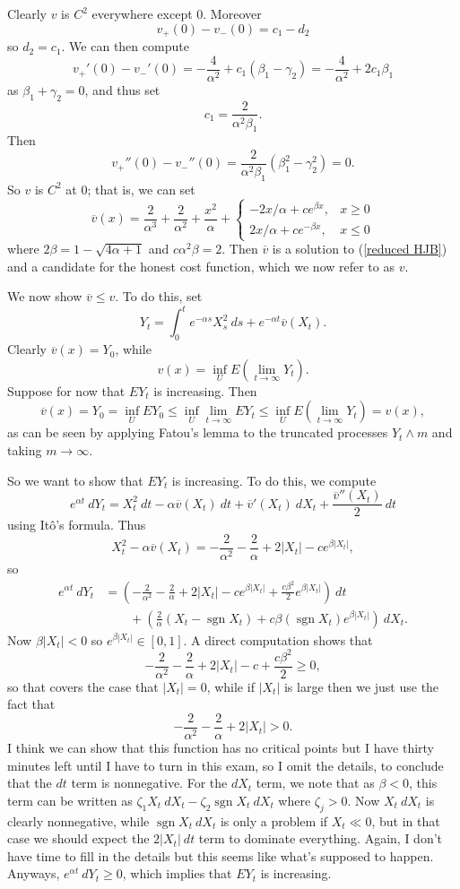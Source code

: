 \documentclass[10pt]{article}
\newcommand{\sgn}{\operatorname{sgn}}
\theoremstyle{definition}
\begin{document}
Clearly $v$ is $C^2$ everywhere except $0$.
Moreover
$$v_+(0) - v_-(0) = c_1 - d_2$$
so $d_2 = c_1$. We can then compute
$$v_+'(0) - v_-'(0) = -\frac{4}{\alpha^2} + c_1(\beta_1 - \gamma_2) = -\frac{4}{\alpha^2} + 2c_1\beta_1$$
as $\beta_1 + \gamma_2 = 0$, and thus set
$$c_1 = \frac{2}{\alpha^2\beta_1}.$$
Then
$$v_+''(0) - v_-''(0) = \frac{2}{\alpha^2\beta_1}(\beta_1^2 - \gamma_2^2) = 0.$$
So $v$ is $C^2$ at $0$; that is, we can set
$$\overline v(x) = \frac{2}{\alpha^3} + \frac{2}{\alpha^2} + \frac{x^2}{\alpha} + \begin{cases}
-2x/\alpha + ce^{\beta x}, &x \geq 0\\
2x/\alpha + ce^{-\beta x}, &x \leq 0
\end{cases}$$
where $2\beta = 1 - \sqrt{4\alpha + 1}$ and $c\alpha^2\beta = 2$.
Then $\overline v$ is a solution to (\ref{reduced HJB}) and a candidate for the honest cost function, which we now refer to as $v$.

We now show $\overline v \leq v$. To do this, set
$$Y_t = \int_0^t e^{-\alpha s} X_s^2 ~ds + e^{-\alpha t} \overline v(X_t).$$
Clearly $\overline v(x) = Y_0$, while
$$v(x) = \inf_U E\left(\lim_{t \to \infty} Y_t\right).$$
Suppose for now that $EY_t$ is increasing. Then
$$\overline v(x) = Y_0 = \inf_U EY_0 \leq \inf_U \lim_{t \to \infty} EY_t \leq \inf_U E\left(\lim_{t \to \infty} Y_t\right) = v(x),$$
as can be seen by applying Fatou's lemma to the truncated processes $Y_t \wedge m$ and taking $m \to \infty$.

So we want to show that $EY_t$ is increasing. To do this, we compute
$$e^{\alpha t} ~dY_t = X_t^2 ~dt - \alpha \overline v(X_t) ~dt + \overline v'(X_t) ~dX_t + \frac{\overline v''(X_t)}{2} ~dt$$
using It\^o's formula.
Thus
$$X_t^2 - \alpha \overline v(X_t) = - \frac{2}{\alpha^2} - \frac{2}{\alpha} + 2|X_t| - ce^{\beta |X_t|},$$
so
\begin{align*}
e^{\alpha t} ~dY_t &= \left(-\frac{2}{\alpha^2} - \frac{2}{\alpha} + 2|X_t| - ce^{\beta |X_t|} + \frac{c\beta^2}{2} e^{\beta|X_t|}\right) ~dt \\
&\qquad+ \left(\frac{2}{\alpha}(X_t - \sgn X_t) + c\beta(\sgn X_t)e^{\beta|X_t|}\right)~dX_t.
\end{align*}
Now $\beta|X_t| < 0$ so $e^{\beta|X_t|} \in [0, 1]$.
A direct computation shows that
$$-\frac{2}{\alpha^2} - \frac{2}{\alpha} + 2|X_t| - c + \frac{c\beta^2}{2} \geq 0,$$
so that covers the case that $|X_t| = 0$, while if $|X_t|$ is large then we just use the fact that
$$-\frac{2}{\alpha^2} - \frac{2}{\alpha} + 2|X_t| > 0.$$
I think we can show that this function has no critical points but I have thirty minutes left until I have to turn in this exam, so I omit the details, to conclude that the $dt$ term is nonnegative.
For the $dX_t$ term, we note that as $\beta < 0$, this term can be written as $\zeta_1 X_t ~dX_t - \zeta_2 \sgn X_t ~dX_t$ where $\zeta_j > 0$.
Now $X_t ~dX_t$ is clearly nonnegative, while $\sgn X_t ~dX_t$ is only a problem if $X_t \ll 0$, but in that case we should expect the $2|X_t| ~dt$ term to dominate everything.
Again, I don't have time to fill in the details but this seems like what's supposed to happen.
Anyways, $e^{\alpha t} ~dY_t \geq 0$, which implies that $EY_t$ is increasing.
\end{document}
